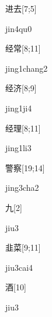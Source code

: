 \begin{verbete}[jin4qu0]{进去}[7;5]
\begin{pronuncia}{jin4qu0}
\end{pronuncia}
\end{verbete}

\begin{verbete}{经常}[8;11]
\begin{pronuncia}{jing1chang2}
\end{pronuncia}
\end{verbete}

\begin{verbete}[jing1ji4]{经济}[8;9]
\begin{pronuncia}{jing1ji4}
\end{pronuncia}
\end{verbete}

\begin{verbete}[jing1li3]{经理}[8;11]
\begin{pronuncia}{jing1li3}
\end{pronuncia}
\end{verbete}

\begin{verbete}{警察}[19;14]
\begin{pronuncia}{jing3cha2}
\end{pronuncia}
\end{verbete}

\begin{verbete}[jiu3]{九}[2]
\begin{pronuncia}{jiu3}
\end{pronuncia}
\end{verbete}

\begin{verbete}{韭菜}[9;11]
\begin{pronuncia}{jiu3cai4}
\end{pronuncia}
\end{verbete}

\begin{verbete}[jiu3]{酒}[10]
\begin{pronuncia}{jiu3}
\end{pronuncia}
\end{verbete}

